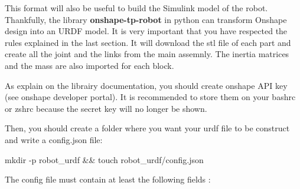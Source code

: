 \bigbreak
This format will also be useful to build the Simulink model of the robot. Thankfully, the library \textbf{onshape-tp-robot} in python can transform Onshape design into an URDF model. It is very important that you have respected the rules explained in the last section. It will download the stl file of each part and create all the joint and the links from the main assemnly. The inertia matrices and the mass are also imported for each block. 

\bigbreak
As explain on the librairy documentation, you should create onshape API key (see onshape developer portal). It is recommended to store them on your bashrc or zshrc because the secret key will no longer be shown.

\bigbreak
\begin{center}
    \begin{minipage}{10cm}
    \end{minipage}
\end{center}

\bigbreak
Then, you should create a folder where you want your urdf file to be construct and write a config.json file:
\begin{commandshell}
    mkdir -p robot\_urdf && touch robot\_urdf/config.json
\end{commandshell} 

\bigbreak
The config file must contain at least the following fields :
\begin{center}
    \begin{minipage}{8cm}
    \end{minipage}
\end{center}

